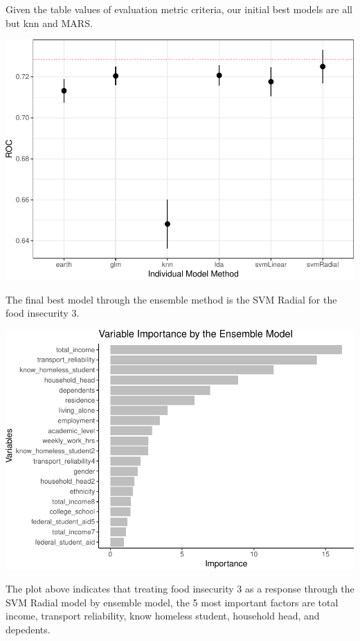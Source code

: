 \documentclass[
  10pt,
]{article}
\begin{document}
\hfill\break
Given the table values of evaluation metric criteria, our initial best models are all but knn and MARS.\\

\begin{center}\includegraphics{phase2_report_files/figure-latex/unnamed-chunk-26-1} \end{center}

\hfill\break
The final best model through the ensemble method is the SVM Radial for the food insecurity 3.\\

\begin{center}\includegraphics{phase2_report_files/figure-latex/unnamed-chunk-27-1} \end{center}

\hfill\break
The plot above indicates that treating food insecurity 3 as a response through the SVM Radial model by ensemble model, the 5 most important factors are total income, transport reliability, know homeless student, household head, and depedents.\\
\end{document}
